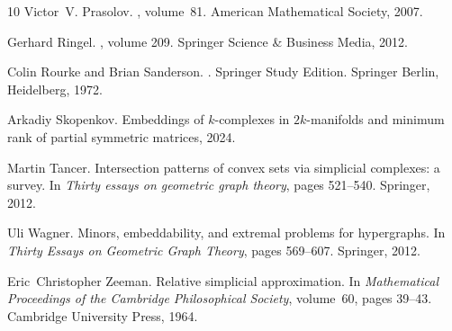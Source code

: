 \documentclass[11pt]{article}
\begin{document}
\begin{thebibliography}{10}
Victor~V. Prasolov.
, volume~81.
\newblock American Mathematical Society, 2007.

Gerhard Ringel.
, volume 209.
\newblock Springer Science \& Business Media, 2012.

Colin Rourke and Brian Sanderson.
.
\newblock Springer Study Edition. Springer Berlin, Heidelberg, 1972.

Arkadiy Skopenkov.
\newblock Embeddings of $k$-complexes in $2k$-manifolds and minimum rank of
  partial symmetric matrices, 2024.

Martin Tancer.
\newblock Intersection patterns of convex sets via simplicial complexes: a
  survey.
\newblock In {\em Thirty essays on geometric graph theory}, pages 521--540.
  Springer, 2012.

Uli Wagner.
\newblock Minors, embeddability, and extremal problems for hypergraphs.
\newblock In {\em Thirty Essays on Geometric Graph Theory}, pages 569--607.
  Springer, 2012.

Eric~Christopher Zeeman.
\newblock Relative simplicial approximation.
\newblock In {\em Mathematical Proceedings of the Cambridge Philosophical
  Society}, volume~60, pages 39--43. Cambridge University Press, 1964.

\end{thebibliography}
\end{document}

